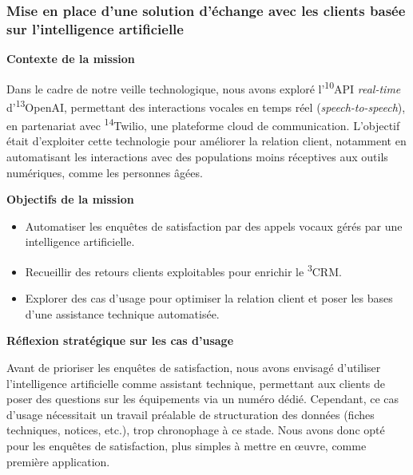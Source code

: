 \subsubsection{Mise en place d’une solution d’échange avec les clients basée sur l’intelligence artificielle}

\textbf{Contexte de la mission}\vspace{0.3cm}

Dans le cadre de notre veille technologique, nous avons exploré l’\textsuperscript{10}API \textit{real-time} d’\textsuperscript{13}OpenAI, permettant des interactions vocales en temps réel (\textit{speech-to-speech}), en partenariat avec \textsuperscript{14}Twilio, une plateforme cloud de communication. L’objectif était d’exploiter cette technologie pour améliorer la relation client, notamment en automatisant les interactions avec des populations moins réceptives aux outils numériques, comme les personnes âgées.\vspace{0.3cm}

\textbf{Objectifs de la mission}\vspace{0.3cm}

\begin{itemize}
    \item Automatiser les enquêtes de satisfaction par des appels vocaux gérés par une intelligence artificielle.\vspace{0.3cm}
    \item Recueillir des retours clients exploitables pour enrichir le \textsuperscript{3}CRM.\vspace{0.3cm}
    \item Explorer des cas d’usage pour optimiser la relation client et poser les bases d’une assistance technique automatisée.\vspace{0.3cm}
\end{itemize}

\textbf{Réflexion stratégique sur les cas d’usage}\vspace{0.3cm}

Avant de prioriser les enquêtes de satisfaction, nous avons envisagé d’utiliser l’intelligence artificielle comme assistant technique, permettant aux clients de poser des questions sur les équipements via un numéro dédié. Cependant, ce cas d’usage nécessitait un travail préalable de structuration des données (fiches techniques, notices, etc.), trop chronophage à ce stade. Nous avons donc opté pour les enquêtes de satisfaction, plus simples à mettre en œuvre, comme première application.\vspace{0.3cm}

